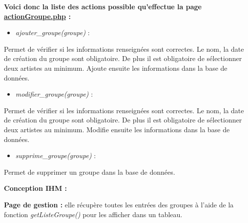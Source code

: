 			\begin{paragraphe}
                \textbf{Voici donc la liste des actions possible qu'effectue la page \underline{actionGroupe.php} :}
            
                \begin{itemize}
                    \item \emph{ajouter\_groupe(groupe)} :
                \end{itemize}
                \begin{paragraphe}
                    Permet de vérifier si les informations renseignées sont correctes. Le nom, la date de création du groupe sont obligatoire. De plus il est obligatoire de sélectionner deux artistes au minimum. Ajoute ensuite les informations dans la base de données.
                \end{paragraphe}
                
                \begin{itemize}
                    \item \emph{modifier\_groupe(groupe)} :
                \end{itemize}
                \begin{paragraphe}
                    Permet de vérifier si les informations renseignées sont correctes. Le nom, la date de création du groupe sont obligatoire. De plus il est obligatoire de sélectionner deux artistes au minimum. Modifie ensuite les informations dans la base de données.
                \end{paragraphe}
                
                \begin{itemize}
                    \item \emph{supprime\_groupe(groupe)} :
                \end{itemize}
                \begin{paragraphe}
                    Permet de supprimer un groupe dans la base de données.
                \end{paragraphe}
            \end{paragraphe}

			\begin{paragraphe}
				\textbf{Conception IHM :}
			\end{paragraphe}
            
            \begin{paragraphe}
                \textbf{Page de gestion :} elle récupère toutes les entrées des groupes à l'aide de la fonction \emph{getListeGroupe()} pour les afficher dans un tableau.
            \end{paragraphe}

